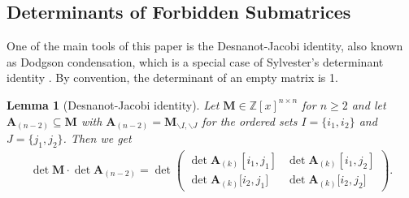 \documentclass[a4paper, 11pt]{article}
\newcommand{\Z}{\mathbb{Z}}
\newcommand{\bA}{\bm{A}}
\newcommand{\bM}{\bm{M}}
\newcommand{\indet}{x}
\newcommand{\polyring}{\Z[\indet]}
\newtheorem{lemma}{Lemma}
\begin{document}
	\subsection{Determinants of Forbidden Submatrices}
	One of the main tools of this paper is the Desnanot-Jacobi identity, also known as Dodgson condensation, which is a special case of Sylvester's determinant identity \cite{sylvester1851relationminors}. By convention, the determinant of an empty matrix is 1.
	\begin{lemma}[Desnanot-Jacobi identity]
		\label{lemma_desnanot_jacobi}
		Let $\bM\in \polyring^{n\times n}$ for $n\geq 2$ and let $\bA_{(n-2)}\subseteq \bM$ with $\bA_{(n-2)} = \bM_{\backslash I,\backslash J}$ for the ordered sets $I=\lbrace i_1,i_2\rbrace$ and $J=\lbrace j_1,j_2\rbrace$. Then we get
		\begin{align*}
		\det\bM\cdot\det\bA_{(n-2)} = \det\begin{pmatrix}
			\det \bA_{(k)}[i_1,j_1]& \det \bA_{(k)}[i_1,j_2] \\
			\det \bA_{(k)}\lbrack i_2, j_1\rbrack & \det \bA_{(k)}\lbrack i_2,j_2\rbrack
		\end{pmatrix}.
	\end{align*}
	\end{lemma}
\end{document}
